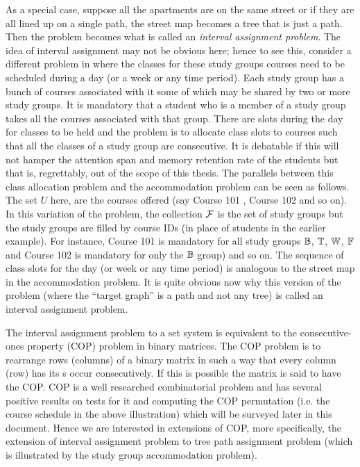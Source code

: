 \documentclass[MS]             %
              {iitmdiss_as}    %
\begin{document}
As a special case, suppose all the apartments are on the same street
or if they are all lined up on a single path, the street map becomes a
tree that is just a path. Then the problem becomes what is called an
{\em interval assignment problem}. The idea of interval assignment may
not be obvious here; hence to see this, consider a different problem
in {\WSI} where the classes for these study groups courses need to be
scheduled during a day (or a week or any time period). Each study
group has a bunch of courses associated with it some of which may be
shared by two or more study groups. It is mandatory that a student who
is a member of a study group takes all the courses associated with
that group. There are slots during the day for classes to be held and
the problem is to allocate class slots to courses such that all the
classes of a study group are consecutive. It is debatable if this will
not hamper the attention span and memory retention rate of the
students but that is, regrettably, out of the scope of this
thesis. The parallels between this class allocation problem and the
accommodation problem can be seen as follows. The set $U$ here, are
the courses offered (say Course 101 {\coneohone}, Course 102
{\coneohtwo} and so on). In this variation of the problem, the
collection ${\cal F}$ is the set of study groups but the study groups are
filled by course IDs (in place of students in the earlier
example). For instance, Course 101 is mandatory for all study groups
$\mathbb{B}$, $\mathbb{T}$, $\mathbb{W}$, $\mathbb{F}$ and Course 102 is mandatory for
only the $\mathbb{B}$ group) and so on. The sequence of class slots for the
day (or week or any time period) is analogous to the street map in the
accommodation problem. It is quite obvious now why this version of the
problem (where the ``target graph'' is a path and not any
tree) is called an interval assignment
problem.

The interval assignment problem to a set system is equivalent to the
consecutive-ones property (COP) problem in binary matrices\cite{wlh02,
  nsnrs09}.  The COP problem is to rearrange rows (columns) of a
binary matrix in such a way that every column (row) has its {\un}s
occur consecutively. If this is possible the matrix is said to have
the COP.  COP is a well researched combinatorial problem and has
several positive results on tests for it and computing the COP
permutation (i.e. the course schedule in the above illustration) which
will be surveyed later in this document. Hence we are interested in
extensions of COP, more specifically, the extension of interval
assignment problem to tree path assignment problem (which is
illustrated by the study group accommodation problem).
\end{document}
